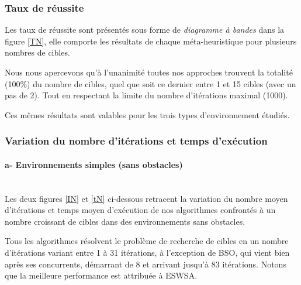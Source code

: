 	\noindent
	\begin{minipage}[t]{0.55\textwidth}
		\subsubsection{Taux de réussite}
		Les taux de réussite sont présentés sous forme de \textit{diagramme à bandes} dans la figure \ref{TN}, elle comporte les résultats de chaque méta-heuristique pour plusieurs nombres de cibles.\\
		\vspace{-0.2cm}
		
		Nous nous apercevons qu'à l'unanimité toutes nos approches trouvent la totalité (100\%) du nombre de cibles, quel que soit ce dernier entre 1 et 15 cibles (avec un pas de 2). Tout en respectant la limite du nombre d'itérations maximal (1000).
		
		Ces mêmes résultats sont valables pour les trois types d'environnement étudiés.
	\end{minipage}\hfill
	\begin{minipage}[t]{0.55\textwidth}
		\captionsetup{width=0.8\linewidth}
		\centering{}
		\label{TN}
	\end{minipage}\hfill
	
	\subsubsection{Variation du nombre d'itérations et temps d'exécution}
	\paragraph{a- Environnements simples (sans obstacles)}
	\textbf{ }\\
	\noindent
	Les deux figures \ref{IN} et \ref{tN} ci-dessous retracent la variation du nombre moyen d'itérations et temps moyen d'exécution de nos algorithmes confrontés à un nombre croissant de cibles dans des environnements sans obstacles.\\
	\vspace{-0.2cm}
	
	Tous les algorithmes résolvent le problème de recherche de cibles en un nombre d'itérations variant entre 1 à 31 itérations, à l'exception de BSO, qui vient bien après ses concurrents, démarrant de 8 et arrivant jusqu'à 83 itérations. Notons que la meilleure performance est attribuée à ESWSA.\\
	\vspace{-0.2cm}
	
